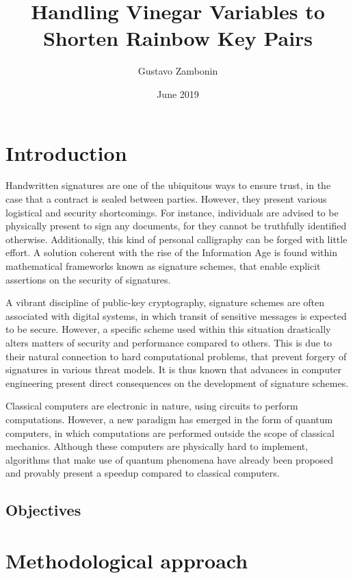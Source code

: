 \documentclass[openright]{report}
\title{Handling Vinegar Variables to Shorten Rainbow Key Pairs}
\author{Gustavo Zambonin}
\date{June 2019}
\begin{document}
\maketitle

\chapter{Introduction}

Handwritten signatures are one of the ubiquitous ways to ensure trust, in the case that a contract is sealed between parties. However, they present various logistical and security shortcomings. For instance, individuals are advised to be physically present to sign any documents, for they cannot be truthfully identified otherwise. Additionally, this kind of personal calligraphy can be forged with little effort. A solution coherent with the rise of the Information Age is found within mathematical frameworks known as signature schemes, that enable explicit assertions on the security of signatures.

A vibrant discipline of public-key cryptography, signature schemes are often associated with digital systems, in which transit of sensitive messages is expected to be secure. However, a specific scheme used within this situation drastically alters matters of security and performance compared to others. This is due to their natural connection to hard computational problems, that prevent forgery of signatures in various threat models. It is thus known that advances in computer engineering present direct consequences on the development of signature schemes.

Classical computers are electronic in nature, using circuits to perform computations. However, a new paradigm has emerged in the form of quantum computers, in which computations are performed outside the scope of classical mechanics. Although these computers are physically hard to implement, algorithms that make use of quantum phenomena have already been proposed and provably present a speedup compared to classical computers.

\section{Objectives}

\chapter{Methodological approach}
\end{document}
